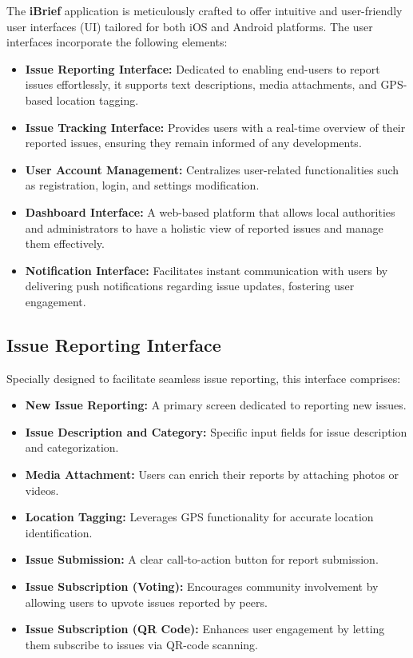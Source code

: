 The \textbf{iBrief} application is meticulously crafted to offer intuitive and user-friendly user interfaces (\gls{UI}) tailored for both iOS and Android platforms. The user interfaces incorporate the following elements:
    
    \begin{itemize}
        \item \textbf{Issue Reporting Interface:} Dedicated to enabling end-users to report issues effortlessly, it supports text descriptions, media attachments, and GPS-based location tagging.
        
        \item \textbf{Issue Tracking Interface:} Provides users with a real-time overview of their reported issues, ensuring they remain informed of any developments.
        
        \item \textbf{User Account Management:} Centralizes user-related functionalities such as registration, login, and settings modification.
        
        \item \textbf{Dashboard Interface:} A web-based platform that allows local authorities and administrators to have a holistic view of reported issues and manage them effectively.
        
        \item \textbf{Notification Interface:} Facilitates instant communication with users by delivering push notifications regarding issue updates, fostering user engagement.
    \end{itemize}

\subsection{Issue Reporting Interface}
    Specially designed to facilitate seamless issue reporting, this interface comprises:
    
    \begin{itemize}
        \item \textbf{New Issue Reporting:} A primary screen dedicated to reporting new issues.
        \item \textbf{Issue Description and Category:} Specific input fields for issue description and categorization.
        \item \textbf{Media Attachment:} Users can enrich their reports by attaching photos or videos.
        \item \textbf{Location Tagging:} Leverages GPS functionality for accurate location identification.
        \item \textbf{Issue Submission:} A clear call-to-action button for report submission.
        \item \textbf{Issue Subscription (Voting):} Encourages community involvement by allowing users to upvote issues reported by peers.
        \item \textbf{Issue Subscription (QR Code):} Enhances user engagement by letting them subscribe to issues via \gls{QR-code} scanning.
    \end{itemize}

